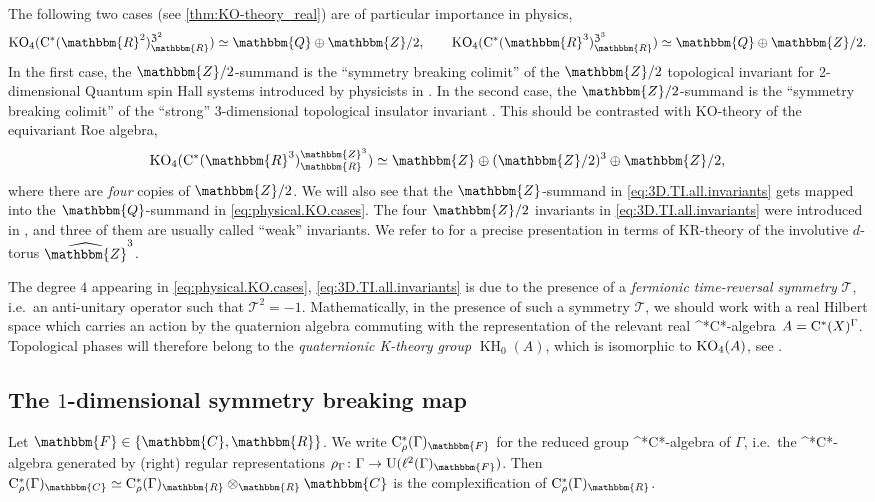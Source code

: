 \documentclass{amsart}
\numberwithin{figure}{section}
\numberwithin{equation}{section}
\numberwithin{table}{section}
\theoremstyle{plain}
\theoremstyle{definition}
\theoremstyle{remark}
\theoremstyle{nonumber}
\newcommand{\Z}{\mathbb{Z}}
\newcommand{\Q}{\mathbb{Q}}
\newcommand{\R}{\mathbb{R}}
\newcommand{\C}{\mathbb{C}}
\newcommand{\F}{\mathbb{F}}
\newcommand{\K}{\relax\ifmmode\operatorname{K}\else\textup{K}\fi}
\newcommand{\KO}{\relax\ifmmode\operatorname{KO}\else\textup{KO}\fi}
\newcommand{\KR}{\relax\ifmmode\operatorname{KR}\else\textup{KR}\fi}
\newcommand{\Cst}{\relax\ifmmode\mathrm{C}^*\else\textup{C*}\fi}
\newcommand{\Cstr}{\Cst_\rho} %
\renewcommand{\mathbb}{\mathbbm} %
\begin{document}
The following two cases (see \cref{thm:KO-theory_real}) are of
particular importance in physics,
\begin{equation}\label{eq:physical.KO.cases}
  \KO_4(\Cst(\R^2)^{\mathfrak{Z}^2}_\R)\simeq\Q\oplus\Z/2,\qquad
  \KO_4(\Cst(\R^3)^{\mathfrak{Z}^3}_\R)\simeq\Q\oplus\Z/2.
\end{equation}
In the first case, the \( \Z/2 \)-summand is the ``symmetry breaking colimit'' of the \( \Z/2 \)
topological invariant for 2-dimensional Quantum spin Hall systems introduced by physicists in
\cite{Kane-Mele:Quantum_spin_Hall_effect}. In the second case, the \( \Z/2 \)-summand 
is the ``symmetry breaking colimit'' of the ``strong'' 3-dimensional
topological insulator invariant 
\cites{Fu-Kane:Topological_insulators_with_inversion_symmetry,Fu-Kane-Mele:TI_in_3D}.
This should be contrasted with KO-theory of the equivariant Roe algebra,
\begin{equation}\label{eq:3D.TI.all.invariants}
\KO_4(\Cst(\R^3)^{\Z^3}_\R)\simeq \Z\oplus (\Z/2)^3\oplus\Z/2,
\end{equation}
where there are \emph{four} copies of $\Z/2$. We will also see that the $\Z$-summand in \eqref{eq:3D.TI.all.invariants} gets mapped into the $\Q$-summand in \eqref{eq:physical.KO.cases}.
The four $\Z/2$ invariants in \eqref{eq:3D.TI.all.invariants} were introduced in
, and three of them are usually called ``weak'' invariants. We refer to
\cites{dNittis-Gomi:Classification_quaternionic,Gomi-Thiang:Real_gerbes}
for a precise presentation in terms of \KR-theory of the involutive
$d$-torus $\widehat{\Z}^3$. 

The degree $4$ appearing in
\eqref{eq:physical.KO.cases}, \eqref{eq:3D.TI.all.invariants} is due to the
presence of a \emph{fermionic time-reversal symmetry} $\mathcal{T}$,
i.e.~an anti-unitary operator such that \( \mathcal{T}^2=-1
\).
Mathematically, in the presence of such a symmetry $\mathcal{T}$, we should work with a
real Hilbert space which carries an action by the quaternion
algebra commuting with the representation of the relevant real
\Cst-algebra \( A=\Cst(X)^{\Gamma} \). 
Topological phases will therefore belong to the \emph{quaternionic
\K-theory group} \( \operatorname{KH}_0(A) \), which is isomorphic to
\( \KO_4(A) \), see
. 

\subsection{The \(1\)-dimensional symmetry breaking map}
\label{sec:symmetry breaking_1-dim}
Let \( \F\in\{\C,\R\} \). We write \( \Cstr(\Gamma)_\F \) for the
reduced group \Cst-algebra of \( \Gamma \), i.e.~the \Cst-algebra
generated by (right) regular representations \( \rho_\Gamma\colon
\Gamma\to\mathrm{U}(\ell^2(\Gamma)_\F) \). Then \(
\Cstr(\Gamma)_\C\simeq\Cstr(\Gamma)_\R\otimes_\R\C \) is the
complexification of \( \Cstr(\Gamma)_\R \). 
\end{document}

